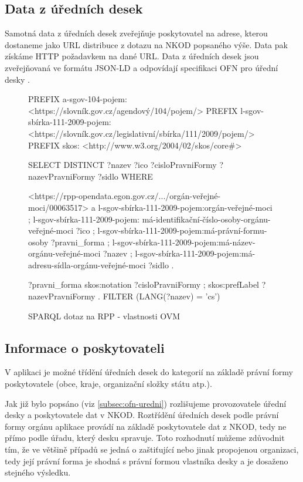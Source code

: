 \subsection{Data z úředních desek}

Samotná data z úředních desek zveřejňuje poskytovatel na adrese, kterou dostaneme jako URL distribuce z dotazu na NKOD popsaného výše. Data pak získáme HTTP požadavkem na dané URL. Data z úředních desek jsou zveřejňovaná ve formátu JSON-LD \cite{JSON-LD} a odpovídají specifikaci OFN pro úřední desky \cite{OFN-UD}.

\begin{figure}[h]
    \label{code:rpp-dotaz}
\begin{code}
PREFIX a-sgov-104-pojem: <https://slovník.gov.cz/agendový/104/pojem/>
PREFIX l-sgov-sbírka-111-2009-pojem:
<https://slovník.gov.cz/legislativní/sbírka/111/2009/pojem/>
PREFIX skos: <http://www.w3.org/2004/02/skos/core#>

SELECT DISTINCT 
    ?nazev ?ico ?cisloPravniFormy ?nazevPravniFormy ?sidlo
WHERE {
  <https://rpp-opendata.egon.gov.cz/.../orgán-veřejné-moci/00063517> 
    a l-sgov-sbírka-111-2009-pojem:orgán-veřejné-moci ;
	l-sgov-sbírka-111-2009-pojem:
	    má-identifikační-číslo-osoby-orgánu-veřejné-moci 
	    ?ico ;
    l-sgov-sbírka-111-2009-pojem:má-právní-formu-osoby 
	    ?pravni_forma ;
  	l-sgov-sbírka-111-2009-pojem:má-název-orgánu-veřejné-moci 
  	    ?nazev ;
    l-sgov-sbírka-111-2009-pojem:má-adresu-sídla-orgánu-veřejné-moci 
        ?sidlo .
  
?pravni_forma   skos:notation ?cisloPravniFormy ;
                skos:prefLabel ?nazevPravniFormy .    
FILTER (LANG(?nazev) = 'cs') 
}
\end{code}
\caption{SPARQL dotaz na RPP - vlastnosti OVM}
\end{figure}

\subsection{Informace o poskytovateli}

V aplikaci je možné třídění úředních desek do kategorií na základě právní formy poskytovatele (obce, kraje, organizační složky státu atp.). 

Jak již bylo popsáno (viz \autoref{subsec:ofn-uredni}) rozlišujeme provozovatele úřední desky a poskytovatele dat v NKOD. Roztřídění úředních desek podle právní formy orgánu aplikace provádí na základě poskytovatele dat z NKOD, tedy ne přímo podle úřadu, který desku spravuje. Toto rozhodnutí můžeme zdůvodnit tím, že ve většině případů se jedná o zaštiťující nebo jinak propojenou organizaci, tedy její právní forma je shodná s právní formou vlastníka desky a je dosaženo stejného výsledku. 

